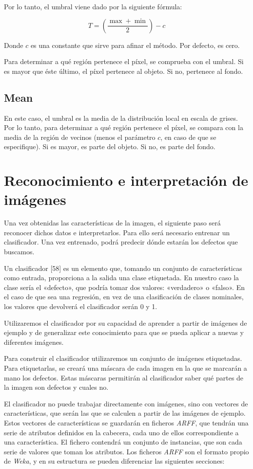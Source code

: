 Por lo tanto, el umbral viene dado por la siguiente fórmula:

\[T = (\frac{\max+\min}{2})-c\]

Donde $c$ es una constante que sirve para afinar el método. Por defecto, es cero.

Para determinar a qué región pertenece el píxel, se comprueba con el umbral. Si es mayor que éste último, el píxel pertenece al objeto. Si no, pertenece al fondo.

\subsection{Mean}
En este caso, el umbral es la media de la distribución local en escala de grises. Por lo tanto, para determinar a qué región pertenece el píxel, se compara con la media de la región de vecinos (menos el parámetro $c$, en caso de que se especifique). Si es mayor, es parte del objeto. Si no, es parte del fondo.




\section{Reconocimiento e interpretación de imágenes}
Una vez obtenidas las características de la imagen, el siguiente paso será reconocer dichos datos e interpretarlos. Para ello será necesario entrenar un clasificador. Una vez entrenado, podrá predecir dónde estarán los defectos que buscamos.

Un clasificador [58] es un elemento que, tomando un conjunto de características como entrada, proporciona a la salida una clase etiquetada. En nuestro caso la clase sería el «defecto», que podría tomar dos valores: «verdadero» o «falso». En el caso de que sea una regresión, en vez de una clasificación de clases nominales, los valores que devolverá el clasificador serán 0 y 1.

Utilizaremos el clasificador por su capacidad de aprender a partir de imágenes de ejemplo y de generalizar este conocimiento para que se pueda aplicar a nuevas y diferentes imágenes.

Para construir el clasificador utilizaremos un conjunto de imágenes etiquetadas. Para etiquetarlas, se creará una máscara de cada imagen en la que se marcarán a mano los defectos. Estas máscaras permitirán al clasificador saber qué partes de la imagen son defectos y cuales no.

El clasificador no puede trabajar directamente con imágenes, sino con vectores de características, que serán las que se calculen a partir de las imágenes de ejemplo. Estos vectores de características se guardarán en ficheros \textit{ARFF}, que tendrán una serie de atributos definidos en la cabecera, cada uno de ellos correspondiente a una característica. El fichero contendrá un conjunto de instancias, que son cada serie de valores que toman los atributos. Los ficheros \textit{ARFF} son el formato propio de \textit{Weka}, y en su estructura se pueden diferenciar las siguientes secciones:

